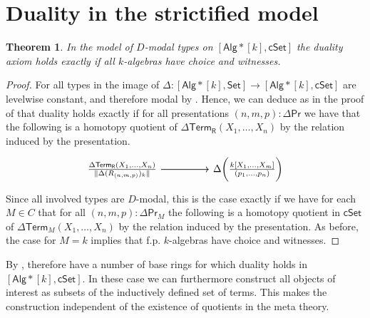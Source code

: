\documentclass[10pt,a4paper]{article}
\newtheorem{theorem}{Theorem}[section]
\theoremstyle{definition}
\theoremstyle{remark}
\newcommand{\Set}{\mathsf{Set}}
\newcommand{\cSet}{\mathsf{cSet}}
\newcommand{\Alg}{\mathsf{Alg}}
\DeclarePairedDelimiter\paren{(}{)}
\newcommand\R{\mathsf{R}}
\renewcommand\Pr{\mathsf{Pr}}
\newcommand\Term{\mathsf{Term}}
\begin{document}
\section{Duality in the strictified model}\label{sec:duality-in-model-of-modal-types}




\begin{theorem}
  In the model of \(D\)-modal types on \([\Alg*[k], \cSet]\) the duality axiom holds exactly if all \(k\)-algebras have choice and witnesses.
\end{theorem}
\begin{proof}
  For all types in the image of \(\Delta \colon [\Alg*[k], \Set] \to [\Alg*[k], \cSet]\) are levelwise constant, and therefore modal by .
  Hence, we can deduce as in the proof of  that duality holds exactly if for all presentations \((n, m, p) \colon \Delta\Pr\) we have that the following is a homotopy quotient of \(\Delta \Term_\R(X_1, \ldots, X_n)\) by the relation induced by the presentation.
  \[\begin{tikzcd}
    {\frac{\Delta \Term_\R(X_1, \ldots, X_n)}{\trunc{\Delta (R_{(n,m,p)})_k}}} && {\Delta\paren[\bigg]{\frac{k[X_1, \ldots, X_m]}{(p_1, \ldots, p_n)}}}
    \arrow[from=1-1, to=1-3]
    \arrow[from=1-1, to=1-3]
  \end{tikzcd}\]
  Since all involved types are \(D\)-modal, this is the case exactly if we have for each \(M \in C\) that for all \((n, m, p) \colon \Delta \Pr_M\) the following is a homotopy quotient in \(\cSet\) of \(\Delta\Term_M(X_1, \ldots, X_n)\) by the relation induced by the presentation.
  As before, the case for \(M = k\) implies that f.p. \(k\)-algebras have choice and witnesses.
\end{proof}

By , therefore have a number of base rings for which duality holds in \([\Alg*[k], \cSet]\).
In these case we can furthermore construct all objects of interest as subsets of the inductively defined set of terms.
This makes the construction independent of the existence of quotients in the meta theory.



\end{document}
